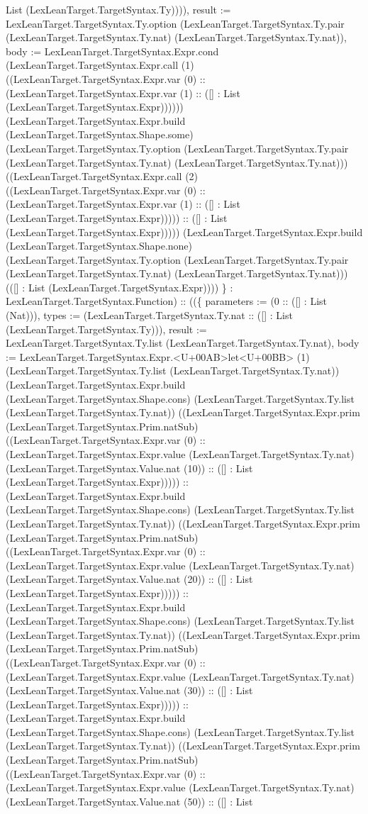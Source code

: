 \documentclass[11pt]{article}
\begin{document}
List (LexLeanTarget.TargetSyntax.Ty)))), result := LexLeanTarget.TargetSyntax.Ty.option (LexLeanTarget.TargetSyntax.Ty.pair (LexLeanTarget.TargetSyntax.Ty.nat) (LexLeanTarget.TargetSyntax.Ty.nat)), body := LexLeanTarget.TargetSyntax.Expr.cond (LexLeanTarget.TargetSyntax.Expr.call (1) ((LexLeanTarget.TargetSyntax.Expr.var (0) :: (LexLeanTarget.TargetSyntax.Expr.var (1) :: ([] : List (LexLeanTarget.TargetSyntax.Expr)))))) (LexLeanTarget.TargetSyntax.Expr.build (LexLeanTarget.TargetSyntax.Shape.some) (LexLeanTarget.TargetSyntax.Ty.option (LexLeanTarget.TargetSyntax.Ty.pair (LexLeanTarget.TargetSyntax.Ty.nat) (LexLeanTarget.TargetSyntax.Ty.nat))) ((LexLeanTarget.TargetSyntax.Expr.call (2) ((LexLeanTarget.TargetSyntax.Expr.var (0) :: (LexLeanTarget.TargetSyntax.Expr.var (1) :: ([] : List (LexLeanTarget.TargetSyntax.Expr))))) :: ([] : List (LexLeanTarget.TargetSyntax.Expr))))) (LexLeanTarget.TargetSyntax.Expr.build (LexLeanTarget.TargetSyntax.Shape.none) (LexLeanTarget.TargetSyntax.Ty.option (LexLeanTarget.TargetSyntax.Ty.pair (LexLeanTarget.TargetSyntax.Ty.nat) (LexLeanTarget.TargetSyntax.Ty.nat))) (([] : List (LexLeanTarget.TargetSyntax.Expr)))) \} : LexLeanTarget.TargetSyntax.Function) :: ((\{ parameters := (0 :: ([] : List (Nat))), types := (LexLeanTarget.TargetSyntax.Ty.nat :: ([] : List (LexLeanTarget.TargetSyntax.Ty))), result := LexLeanTarget.TargetSyntax.Ty.list (LexLeanTarget.TargetSyntax.Ty.nat), body := LexLeanTarget.TargetSyntax.Expr.<U+00AB>let<U+00BB> (1) (LexLeanTarget.TargetSyntax.Ty.list (LexLeanTarget.TargetSyntax.Ty.nat)) (LexLeanTarget.TargetSyntax.Expr.build (LexLeanTarget.TargetSyntax.Shape.cons) (LexLeanTarget.TargetSyntax.Ty.list (LexLeanTarget.TargetSyntax.Ty.nat)) ((LexLeanTarget.TargetSyntax.Expr.prim (LexLeanTarget.TargetSyntax.Prim.natSub) ((LexLeanTarget.TargetSyntax.Expr.var (0) :: (LexLeanTarget.TargetSyntax.Expr.value (LexLeanTarget.TargetSyntax.Ty.nat) (LexLeanTarget.TargetSyntax.Value.nat (10)) :: ([] : List (LexLeanTarget.TargetSyntax.Expr))))) :: (LexLeanTarget.TargetSyntax.Expr.build (LexLeanTarget.TargetSyntax.Shape.cons) (LexLeanTarget.TargetSyntax.Ty.list (LexLeanTarget.TargetSyntax.Ty.nat)) ((LexLeanTarget.TargetSyntax.Expr.prim (LexLeanTarget.TargetSyntax.Prim.natSub) ((LexLeanTarget.TargetSyntax.Expr.var (0) :: (LexLeanTarget.TargetSyntax.Expr.value (LexLeanTarget.TargetSyntax.Ty.nat) (LexLeanTarget.TargetSyntax.Value.nat (20)) :: ([] : List (LexLeanTarget.TargetSyntax.Expr))))) :: (LexLeanTarget.TargetSyntax.Expr.build (LexLeanTarget.TargetSyntax.Shape.cons) (LexLeanTarget.TargetSyntax.Ty.list (LexLeanTarget.TargetSyntax.Ty.nat)) ((LexLeanTarget.TargetSyntax.Expr.prim (LexLeanTarget.TargetSyntax.Prim.natSub) ((LexLeanTarget.TargetSyntax.Expr.var (0) :: (LexLeanTarget.TargetSyntax.Expr.value (LexLeanTarget.TargetSyntax.Ty.nat) (LexLeanTarget.TargetSyntax.Value.nat (30)) :: ([] : List (LexLeanTarget.TargetSyntax.Expr))))) :: (LexLeanTarget.TargetSyntax.Expr.build (LexLeanTarget.TargetSyntax.Shape.cons) (LexLeanTarget.TargetSyntax.Ty.list (LexLeanTarget.TargetSyntax.Ty.nat)) ((LexLeanTarget.TargetSyntax.Expr.prim (LexLeanTarget.TargetSyntax.Prim.natSub) ((LexLeanTarget.TargetSyntax.Expr.var (0) :: (LexLeanTarget.TargetSyntax.Expr.value (LexLeanTarget.TargetSyntax.Ty.nat) (LexLeanTarget.TargetSyntax.Value.nat (50)) :: ([] : List 
\end{document}
